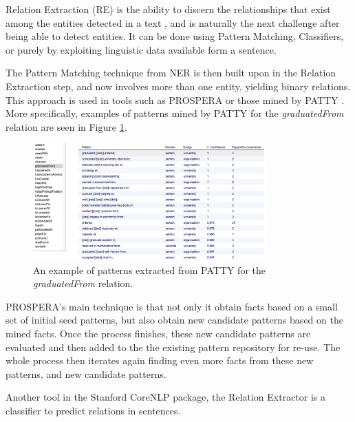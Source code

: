 \documentclass[11pt,a4paper,openright]{memoir}
\begin{document}
Relation Extraction (RE) is the ability to discern the relationships that exist among the entities detected in a text \cite{Jurafsky:2000:SLP:555733}, and is naturally the next challenge after being able to detect entities. It can be done using Pattern Matching, Classifiers, or purely by exploiting linguistic data available form a sentence.

The Pattern Matching technique from NER is then built upon in the Relation Extraction step, and now involves more than one entity, yielding binary relations. This approach is used in tools such as PROSPERA \cite{Nakashole:2011:SKH:1935826.1935869} or those mined by PATTY \cite{Nakashole:2012:PTR:2390948.2391076}. More specifically, examples of patterns mined by PATTY for the \emph{graduatedFrom} relation are seen in Figure \ref{fig:patty_examples}.

\begin{figure}[!htbp]
  \centering
    \includegraphics[width=0.8\textwidth]{./images/patty}
  \caption[An example of patterns extracted from PATTY.]{An example of patterns extracted from PATTY for the \emph{graduatedFrom} relation.}
  \label{fig:patty_examples}
\end{figure}

PROSPERA's main technique is that not only it obtain facts based on a small set of initial seed patterns, but also obtain new candidate patterns based on the mined facts. Once the process finishes, these new candidate patterns are evaluated and then added to the the existing pattern repository for re-use. The whole process then iterates again finding even more facts from these new patterns, and new candidate patterns.

Another tool in the Stanford CoreNLP package, the Relation Extractor \cite{Surdeanu:2011:CIE:2021153.2021155} is a classifier to predict relations in sentences.
\end{document}
